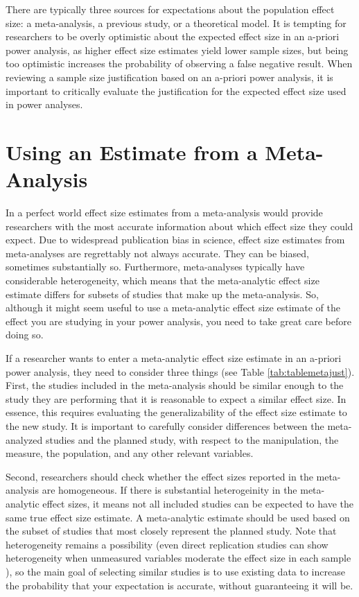 \documentclass[
  oneside]{krantz}
\begin{document}
There are typically three sources for expectations about the population effect size: a meta-analysis, a previous study, or a theoretical model. It is tempting for researchers to be overly optimistic about the expected effect size in an a-priori power analysis, as higher effect size estimates yield lower sample sizes, but being too optimistic increases the probability of observing a false negative result. When reviewing a sample size justification based on an a-priori power analysis, it is important to critically evaluate the justification for the expected effect size used in power analyses.

\hypertarget{using-an-estimate-from-a-meta-analysis}{%
\section{Using an Estimate from a Meta-Analysis}\label{using-an-estimate-from-a-meta-analysis}}

In a perfect world effect size estimates from a meta-analysis would provide researchers with the most accurate information about which effect size they could expect. Due to widespread publication bias in science, effect size estimates from meta-analyses are regrettably not always accurate. They can be biased, sometimes substantially so. Furthermore, meta-analyses typically have considerable heterogeneity, which means that the meta-analytic effect size estimate differs for subsets of studies that make up the meta-analysis. So, although it might seem useful to use a meta-analytic effect size estimate of the effect you are studying in your power analysis, you need to take great care before doing so.

If a researcher wants to enter a meta-analytic effect size estimate in an a-priori power analysis, they need to consider three things (see Table \ref{tab:tablemetajust}). First, the studies included in the meta-analysis should be similar enough to the study they are performing that it is reasonable to expect a similar effect size. In essence, this requires evaluating the generalizability of the effect size estimate to the new study. It is important to carefully consider differences between the meta-analyzed studies and the planned study, with respect to the manipulation, the measure, the population, and any other relevant variables.

Second, researchers should check whether the effect sizes reported in the meta-analysis are homogeneous. If there is substantial heterogeinity in the meta-analytic effect sizes, it means not all included studies can be expected to have the same true effect size estimate. A meta-analytic estimate should be used based on the subset of studies that most closely represent the planned study. Note that heterogeneity remains a possibility (even direct replication studies can show heterogeneity when unmeasured variables moderate the effect size in each sample \citep{kenny_unappreciated_2019, olsson-collentine_heterogeneity_2020}), so the main goal of selecting similar studies is to use existing data to increase the probability that your expectation is accurate, without guaranteeing it will be.
\end{document}
